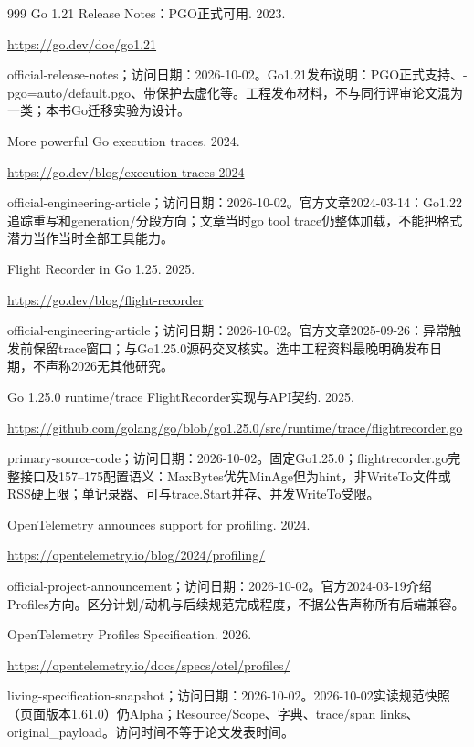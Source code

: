 \documentclass[UTF8,fontset=fandol,openany,11pt]{ctexbook}
\begin{document}
\begin{thebibliography}{999}
 Go 1.21 Release Notes：PGO正式可用. 2023.\par
\url{https://go.dev/doc/go1.21}\par
{\small official-release-notes；访问日期：2026-10-02。Go1.\allowbreak{}21发布说明：PGO正式支持、-\allowbreak{}pgo=auto/\allowbreak{}default.\allowbreak{}pgo、带保护去虚化等。工程发布材料，不与同行评审论文混为一类；本书Go迁移实验为设计。}

 More powerful Go execution traces. 2024.\par
\url{https://go.dev/blog/execution-traces-2024}\par
{\small official-engineering-article；访问日期：2026-10-02。官方文章2024-\allowbreak{}03-\allowbreak{}14：Go1.\allowbreak{}22追踪重写和generation/\allowbreak{}分段方向；文章当时go tool trace仍整体加载，不能把格式潜力当作当时全部工具能力。}

 Flight Recorder in Go 1.25. 2025.\par
\url{https://go.dev/blog/flight-recorder}\par
{\small official-engineering-article；访问日期：2026-10-02。官方文章2025-\allowbreak{}09-\allowbreak{}26：异常触发前保留trace窗口；与Go1.\allowbreak{}25.\allowbreak{}0源码交叉核实。选中工程资料最晚明确发布日期，不声称2026无其他研究。}

 Go 1.25.0 runtime/trace FlightRecorder实现与API契约. 2025.\par
\url{https://github.com/golang/go/blob/go1.25.0/src/runtime/trace/flightrecorder.go}\par
{\small primary-source-code；访问日期：2026-10-02。固定Go1.\allowbreak{}25.\allowbreak{}0；flightreco\allowbreak{}rder.\allowbreak{}go完整接口及157–175配置语义：MaxBytes优先MinAge但为hint，非WriteTo文件或RSS硬上限；单记录器、可与trace.\allowbreak{}Start并存、并发WriteTo受限。}

 OpenTelemetry announces support for profiling. 2024.\par
\url{https://opentelemetry.io/blog/2024/profiling/}\par
{\small official-project-announcement；访问日期：2026-10-02。官方2024-\allowbreak{}03-\allowbreak{}19介绍Profiles方向。区分计划/\allowbreak{}动机与后续规范完成程度，不据公告声称所有后端兼容。}

 OpenTelemetry Profiles Specification. 2026.\par
\url{https://opentelemetry.io/docs/specs/otel/profiles/}\par
{\small living-specification-snapshot；访问日期：2026-10-02。2026-\allowbreak{}10-\allowbreak{}02实读规范快照（页面版本1.\allowbreak{}61.\allowbreak{}0）仍Alpha；Resource/\allowbreak{}Scope、字典、trace/\allowbreak{}span links、original\_\allowbreak{}payload。访问时间不等于论文发表时间。}


\end{thebibliography}
\end{document}
